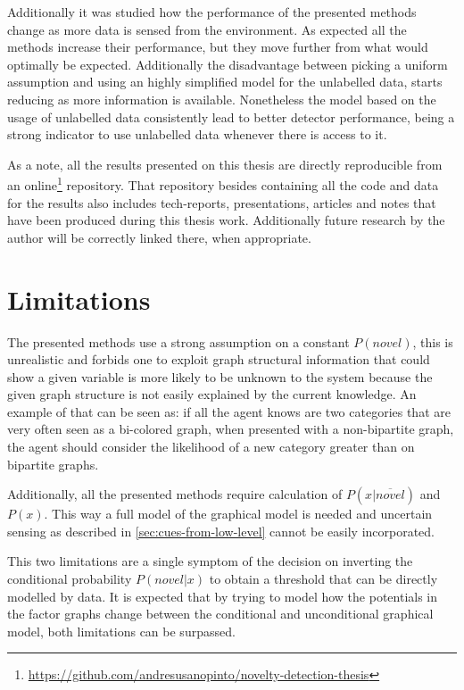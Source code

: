 Additionally it was studied how the performance of the presented methods change as more data
is sensed from the environment. As expected all the methods increase their performance, but they
move further from what would optimally be expected.
Additionally the disadvantage between picking a uniform assumption and using an highly simplified
model for the unlabelled data, starts reducing as more information is available.
Nonetheless the model based on the usage of unlabelled data consistently lead to better detector
performance, being a strong indicator to use unlabelled data whenever there is access to it.

As a note, all the results presented on this thesis are directly reproducible from an
online\footnote{\url{https://github.com/andresusanopinto/novelty-detection-thesis}}
repository. That repository besides containing all the code and data for the results also
includes tech-reports, presentations, articles and notes that have been produced during
this thesis work. Additionally future research by the author will be correctly linked there,
when appropriate.

\section{Limitations}

The presented methods use a strong assumption on a constant $P(novel)$, this is unrealistic and
forbids one to exploit graph structural information that could show a given variable is more likely
to be unknown to the system because the given graph structure is not easily explained by the
current knowledge.
An example of that can be seen as: if all the agent knows are two categories that are very often
seen as a bi-colored graph, when presented with a non-bipartite graph, the agent should consider
the likelihood of a new category greater than on bipartite graphs.

Additionally, all the presented methods require calculation of $P(x|\overline{novel})$ and
$P(x)$. This way a full model of the graphical model is needed and uncertain sensing as described in
\autoref{sec:cues-from-low-level} cannot be easily incorporated.

This two limitations are a single symptom of the decision on inverting the conditional probability
$P(novel|x)$ to obtain a threshold that can be directly modelled by data.
It is expected that by trying to model how the potentials in the factor graphs change between the
conditional and unconditional graphical model, both limitations can be surpassed.

